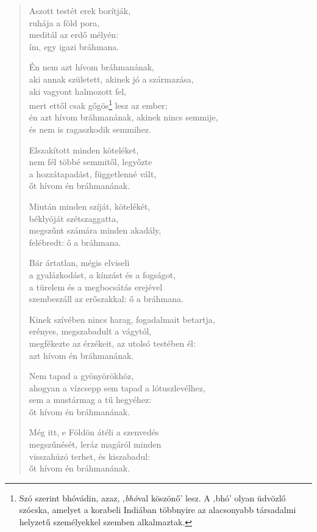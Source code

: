 \begin{verse}
 Aszott testét erek borítják,\\
ruhája a föld pora,\\
meditál az erdő mélyén:\\
ím, egy igazi bráhmana.

 Én nem azt hívom bráhmanának,\\
aki annak született, akinek jó a származása,\\
aki vagyont halmozott fel,\\
mert ettől csak gőgös\footnote{Szó szerint bhóvádin, azaz‚ ‚\textit{bhó}val köszönő’ lesz. A ‚bhó’ olyan üdvözlő szócska, amelyet a korabeli Indiában többnyire az alacsonyabb társadalmi helyzetű személyekkel szemben alkalmaztak.} lesz az ember;\\
én azt hívom bráhmanának, akinek nincs semmije,\\
és nem is ragaszkodik semmihez.

 Elszakított minden köteléket,\\
nem fél többé semmitől, legyőzte\\
a hozzátapadást, függetlenné vált,\\
őt hívom én bráhmanának.

 Miután minden szíját, kötelékét,\\
béklyóját szétszaggatta,\\
megszűnt számára minden akadály,\\
felébredt: ő a bráhmana.

 Bár ártatlan, mégis elviseli\\
a gyalázkodást, a kínzást és a fogságot,\\
a türelem és a megbocsátás erejével\\
szembeszáll az erőszakkal: ő a bráhmana.

 Kinek szívében nincs harag, fogadalmait betartja,\\
erényes, megszabadult a vágytól,\\
megfékezte az érzékeit, az utolsó testében él:\\
azt hívom én bráhmanának.

 Nem tapad a gyönyörökhöz,\\
ahogyan a vízcsepp sem tapad a lótuszlevélhez,\\
sem a mustármag a tű hegyéhez:\\
őt hívom én bráhmanának.

 Még itt, e Földön átéli a szenvedés\\
megszűnését, leráz magáról minden\\
visszahúzó terhet, és kiszabadul:\\
őt hívom én bráhmanának.


\end{verse}
